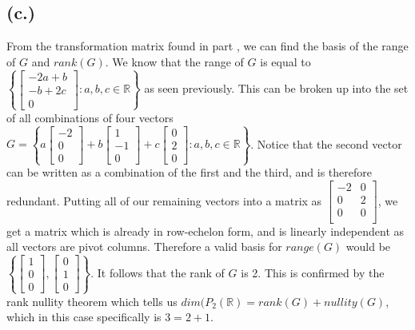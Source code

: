 \documentclass{article}
\begin{document}
	\subsection*{(c.)}
		From the transformation matrix found in part , we can find the basis of the range of $G$ and $rank(G)$.
		We know that the range of $G$ is equal to $\left \{
		\begin{bmatrix}
			-2a+b \\
			-b+2c \\
			0
		\end{bmatrix}
		: a,b,c \in \mathbb{R} \right \}$ as seen previously. This can be broken up into the set of all combinations of four vectors
		$G = \left \{
		a \begin{bmatrix} -2 \\ 0 \\ 0\end{bmatrix} +
		b \begin{bmatrix} 1 \\ -1 \\ 0 \end{bmatrix} +
		c \begin{bmatrix} 0 \\ 2 \\ 0  \end{bmatrix}
		: a,b,c \in \mathbb{R} \right \}$. Notice that the second vector can be written as a combination of the first and the third, and is therefore redundant.
		Putting all of our remaining vectors into a matrix as
		$\begin{bmatrix}
			-2 & 0 \\
			0 & 2 \\
			0 & 0 \\
		\end{bmatrix}$, we get a matrix which is already in row-echelon form, and is linearly independent as all vectors are pivot columns.
		Therefore a valid basis for $range(G)$ would be $\left \{ 
		\begin{bmatrix} 1 \\ 0 \\ 0 \end{bmatrix},
		\begin{bmatrix} 0 \\ 1 \\ 0 \end{bmatrix} \right \}$.
		It follows that the rank of $G$ is 2.
		This is confirmed by the rank nullity theorem which tells us $dim(P_2(\mathbb{R}) = rank(G) + nullity(G)$, which in this case specifically is $3 = 2 + 1$.
\end{document}
